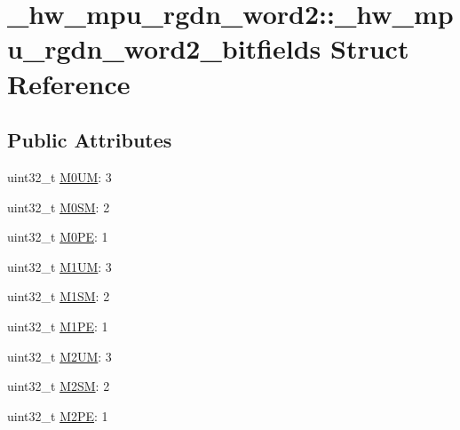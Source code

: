 \hypertarget{struct__hw__mpu__rgdn__word2_1_1__hw__mpu__rgdn__word2__bitfields}{}\section{\+\_\+hw\+\_\+mpu\+\_\+rgdn\+\_\+word2\+:\+:\+\_\+hw\+\_\+mpu\+\_\+rgdn\+\_\+word2\+\_\+bitfields Struct Reference}
\label{struct__hw__mpu__rgdn__word2_1_1__hw__mpu__rgdn__word2__bitfields}
\subsection*{Public Attributes}
\begin{DoxyCompactItemize}
\item 
uint32\+\_\+t \hyperlink{struct__hw__mpu__rgdn__word2_1_1__hw__mpu__rgdn__word2__bitfields_ab23565420762dbf58de1d58505152fc2}{M0\+UM}\+: 3
\item 
uint32\+\_\+t \hyperlink{struct__hw__mpu__rgdn__word2_1_1__hw__mpu__rgdn__word2__bitfields_a35d01b917b9c30296a9908d1277999cc}{M0\+SM}\+: 2
\item 
uint32\+\_\+t \hyperlink{struct__hw__mpu__rgdn__word2_1_1__hw__mpu__rgdn__word2__bitfields_a186df49d3bb6f3fde9cfbe6e9b422b92}{M0\+PE}\+: 1
\item 
uint32\+\_\+t \hyperlink{struct__hw__mpu__rgdn__word2_1_1__hw__mpu__rgdn__word2__bitfields_a82b55c0895dfa13bbaa865379f18e8f0}{M1\+UM}\+: 3
\item 
uint32\+\_\+t \hyperlink{struct__hw__mpu__rgdn__word2_1_1__hw__mpu__rgdn__word2__bitfields_a60d3aabe7298113854571fdd3d7a8024}{M1\+SM}\+: 2
\item 
uint32\+\_\+t \hyperlink{struct__hw__mpu__rgdn__word2_1_1__hw__mpu__rgdn__word2__bitfields_a930bd057e0a7d68b569ab3b1cef18d5d}{M1\+PE}\+: 1
\item 
uint32\+\_\+t \hyperlink{struct__hw__mpu__rgdn__word2_1_1__hw__mpu__rgdn__word2__bitfields_ad40b3c807824b88919afbfc7b8cc7834}{M2\+UM}\+: 3
\item 
uint32\+\_\+t \hyperlink{struct__hw__mpu__rgdn__word2_1_1__hw__mpu__rgdn__word2__bitfields_a2d84054bd1e86dbaf93f8d2324c82cca}{M2\+SM}\+: 2
\item 
uint32\+\_\+t \hyperlink{struct__hw__mpu__rgdn__word2_1_1__hw__mpu__rgdn__word2__bitfields_a7b8d1f60c76110f715c8f0d8024783e1}{M2\+PE}\+: 1
\item 

\end{DoxyCompactItemize}
